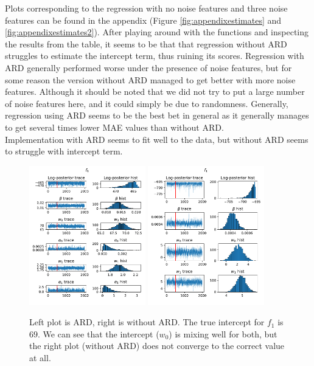\documentclass[12pt]{article}
\begin{document}
        Plots corresponding to the regression with no noise features and three noise features can be found in the appendix (Figure \ref{fig:appendixestimates} and \ref{fig:appendixestimates2}). After playing around with the functions and inspecting the results from the table, it seems to be that that regression without ARD struggles to estimate the intercept term, thus ruining its scores. Regression with ARD generally performed worse under the presence of noise features, but for some reason the version without ARD managed to get better with more noise features. Although it should be noted that we did not try to put a large number of noise features here, and it could simply be due to randomness. Generally, regression using ARD seems to be the best bet in general as it generally manages to get several times lower MAE values than without ARD. \\
        
        Implementation with ARD seems to fit well to the data, but without ARD seems to struggle with intercept term. 

        \begin{figure}[H]
            \centering
            \includegraphics[width=0.45\textwidth]{f_1_noise0_tplot_ard.pdf}
            \includegraphics[width=0.45\textwidth]{f_1_noise0_tplot_reg.pdf}
            \caption{Left plot is ARD, right is without ARD. The true intercept for $f_1$ is $69$. We can see that the intercept ($w_0$) is mixing well for both, but the right plot (without ARD) does not converge to the correct value at all.}
        \end{figure}
\end{document}
